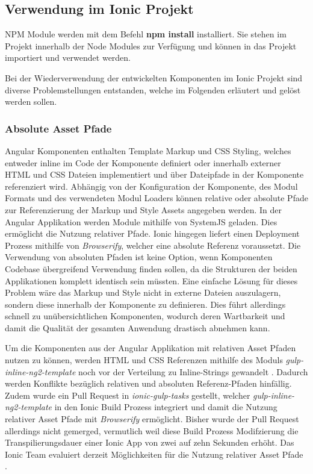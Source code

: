 \subsection{Verwendung im Ionic Projekt}
\ac{NPM} Module werden mit dem Befehl \textbf{npm install} installiert.
Sie stehen im Projekt innerhalb der Node Modules zur Verfügung und können in das Projekt importiert und verwendet werden.

Bei der Wiederverwendung der entwickelten Komponenten im Ionic Projekt sind diverse Problemstellungen entstanden,
welche im Folgenden erläutert und gelöst werden sollen.

\subsubsection{Absolute Asset Pfade}

Angular Komponenten enthalten Template Markup und \ac{CSS} Styling, welches entweder inline im Code der Komponente
definiert oder innerhalb externer \ac{HTML} und \ac{CSS} Dateien implementiert und über Dateipfade in der Komponente referenziert wird.
Abhängig von der Konfiguration der Komponente, des Modul Formats und des verwendeten Modul Loaders
können relative oder absolute Pfade zur Referenzierung der Markup und Style Assets angegeben werden.
In der Angular Applikation werden Module mithilfe von SystemJS geladen. Dies ermöglicht die Nutzung relativer Pfade.
Ionic hingegen liefert einen Deployment Prozess mithilfe von \emph{Browserify}, welcher eine absolute Referenz voraussetzt.
Die Verwendung von absoluten Pfaden ist keine Option, wenn Komponenten Codebase übergreifend Verwendung finden sollen,
da die Strukturen der beiden Applikationen komplett identisch sein müssten.
Eine einfache Lösung für dieses Problem wäre das Markup und Style nicht in externe Dateien auszulagern,
sondern diese innerhalb der Komponente zu definieren.
Dies führt allerdings schnell zu unübersichtlichen Komponenten,
wodurch deren Wartbarkeit und damit die Qualität der gesamten Anwendung drastisch abnehmen kann.

Um die Komponenten aus der Angular Applikation mit relativen Asset Pfaden nutzen zu können,
werden \ac{HTML} und \ac{CSS} Referenzen mithilfe des Moduls \emph{gulp-inline-ng2-template} noch vor der Verteilung zu Inline-Strings gewandelt \cite{ludoh30:online}.
Dadurch werden Konflikte bezüglich relativen und absoluten Referenz-Pfaden hinfällig.
Zudem wurde ein Pull Request in \emph{ionic-gulp-tasks} gestellt, welcher \emph{gulp-inline-ng2-template}
in den Ionic Build Prozess integriert und damit die Nutzung relativer Asset Pfade mit \emph{Browserify} ermöglicht.
Bisher wurde der Pull Request allerdings nicht gemerged, vermutlich weil diese Build Prozess Modifzierung die
Transpilierungsdauer einer Ionic App von zwei auf zehn Sekunden erhöht.
Das Ionic Team evaluiert derzeit Möglichkeiten für die Nutzung relativer Asset Pfade \cite{relat31:online}.

